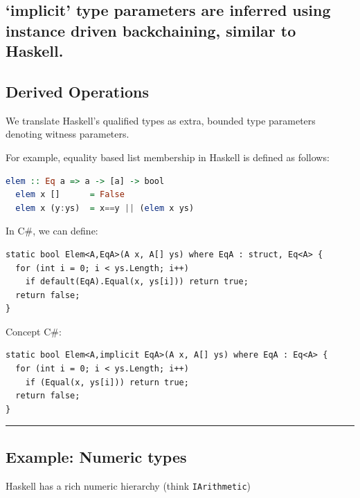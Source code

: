 \subsection{\texorpdfstring{`implicit' type parameters are inferred
using instance driven backchaining, similar to
Haskell.}{implicit type parameters are inferred using instance driven backchaining, similar to Haskell.}}\label{implicit-type-parameters-are-inferred-using-instance-driven-backchaining-similar-to-haskell.}

\subsection{Derived Operations}\label{derived-operations}

We translate Haskell's qualified types as extra, bounded type parameters
denoting witness parameters.

For example, equality based list membership in Haskell is defined as
follows:

\begin{lstlisting}[language=Haskell]
  elem :: Eq a => a -> [a] -> bool
  elem x []      = False
  elem x (y:ys)  = x==y || (elem x ys)  
\end{lstlisting}

In C\#, we can define:

\begin{lstlisting}
static bool Elem<A,EqA>(A x, A[] ys) where EqA : struct, Eq<A> {
  for (int i = 0; i < ys.Length; i++)  
    if default(EqA).Equal(x, ys[i])) return true;
  return false;
}
\end{lstlisting}

Concept C\#:

\begin{lstlisting}
static bool Elem<A,implicit EqA>(A x, A[] ys) where EqA : Eq<A> {
  for (int i = 0; i < ys.Length; i++) 
    if (Equal(x, ys[i])) return true;
  return false;
}
\end{lstlisting}

\begin{center}\rule{0.5\linewidth}{\linethickness}\end{center}

\subsection{Example: Numeric types}\label{example-numeric-types}

Haskell has a rich numeric hierarchy (think \lstinline!IArithmetic!)

